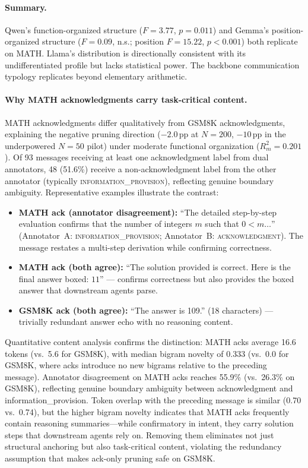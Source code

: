 \paragraph{Summary.} Qwen's function-organized structure ($F = 3.77$, $p = 0.011$) and Gemma's position-organized structure ($F = 0.09$, n.s.; position $F = 15.22$, $p < 0.001$) both replicate on MATH. Llama's distribution is directionally consistent with its undifferentiated profile but lacks statistical power. The backbone communication typology replicates beyond elementary arithmetic.

\paragraph{Why MATH acknowledgments carry task-critical content.}
MATH acknowledgments differ qualitatively from GSM8K acknowledgments, explaining the negative pruning direction ($-2.0$\,pp at $N{=}200$, $-10$\,pp in the underpowered $N{=}50$ pilot) under moderate functional organization ($R^2_m = 0.201$). Of 93 messages receiving at least one acknowledgment label from dual annotators, 48 (51.6\%) receive a non-acknowledgment label from the other annotator (typically \textsc{information\_provision}), reflecting genuine boundary ambiguity. Representative examples illustrate the contrast:

\begin{itemize}[nosep, leftmargin=*]
\item \textbf{MATH ack (annotator disagreement):} ``The detailed step-by-step evaluation confirms that the number of integers $m$ such that $0 < m \ldots$'' (Annotator~A: \textsc{information\_provision}; Annotator~B: \textsc{acknowledgment}). The message restates a multi-step derivation while confirming correctness.
\item \textbf{MATH ack (both agree):} ``The solution provided is correct. Here is the final answer boxed: $\boxed{11}$'' --- confirms correctness but also provides the boxed answer that downstream agents parse.
\item \textbf{GSM8K ack (both agree):} ``The answer is 109.'' (18 characters) --- trivially redundant answer echo with no reasoning content.
\end{itemize}

\noindent Quantitative content analysis confirms the distinction: MATH acks average 16.6 tokens (vs.\ 5.6 for GSM8K), with median bigram novelty of 0.333 (vs.\ 0.0 for GSM8K, where acks introduce no new bigrams relative to the preceding message). Annotator disagreement on MATH acks reaches 55.9\% (vs.\ 26.3\% on GSM8K), reflecting genuine boundary ambiguity between acknowledgment and information\_provision. Token overlap with the preceding message is similar (0.70 vs.\ 0.74), but the higher bigram novelty indicates that MATH acks frequently contain reasoning summaries---while confirmatory in intent, they carry solution steps that downstream agents rely on. Removing them eliminates not just structural anchoring but also task-critical content, violating the redundancy assumption that makes ack-only pruning safe on GSM8K.

